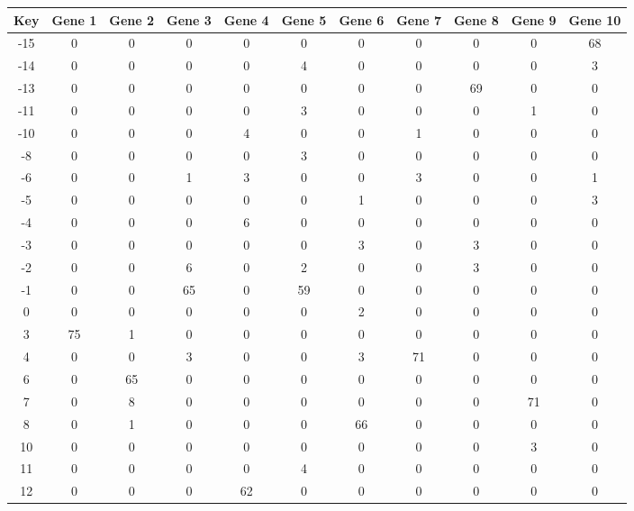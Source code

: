 \begin{tabular}{|c|c|c|c|c|c|c|c|c|c|c|}
\hline
Key & Gene 1 & Gene 2 & Gene 3 & Gene 4 & Gene 5 & Gene 6 & Gene 7 & Gene 8 & Gene 9 & Gene 10 \\
\hline
-15 & 0 & 0 & 0 & 0 & 0 & 0 & 0 & 0 & 0 & 68 \\
-14 & 0 & 0 & 0 & 0 & 4 & 0 & 0 & 0 & 0 & 3 \\
-13 & 0 & 0 & 0 & 0 & 0 & 0 & 0 & 69 & 0 & 0 \\
-11 & 0 & 0 & 0 & 0 & 3 & 0 & 0 & 0 & 1 & 0 \\
-10 & 0 & 0 & 0 & 4 & 0 & 0 & 1 & 0 & 0 & 0 \\
-8 & 0 & 0 & 0 & 0 & 3 & 0 & 0 & 0 & 0 & 0 \\
-6 & 0 & 0 & 1 & 3 & 0 & 0 & 3 & 0 & 0 & 1 \\
-5 & 0 & 0 & 0 & 0 & 0 & 1 & 0 & 0 & 0 & 3 \\
-4 & 0 & 0 & 0 & 6 & 0 & 0 & 0 & 0 & 0 & 0 \\
-3 & 0 & 0 & 0 & 0 & 0 & 3 & 0 & 3 & 0 & 0 \\
-2 & 0 & 0 & 6 & 0 & 2 & 0 & 0 & 3 & 0 & 0 \\
-1 & 0 & 0 & 65 & 0 & 59 & 0 & 0 & 0 & 0 & 0 \\
0 & 0 & 0 & 0 & 0 & 0 & 2 & 0 & 0 & 0 & 0 \\
3 & 75 & 1 & 0 & 0 & 0 & 0 & 0 & 0 & 0 & 0 \\
4 & 0 & 0 & 3 & 0 & 0 & 3 & 71 & 0 & 0 & 0 \\
6 & 0 & 65 & 0 & 0 & 0 & 0 & 0 & 0 & 0 & 0 \\
7 & 0 & 8 & 0 & 0 & 0 & 0 & 0 & 0 & 71 & 0 \\
8 & 0 & 1 & 0 & 0 & 0 & 66 & 0 & 0 & 0 & 0 \\
10 & 0 & 0 & 0 & 0 & 0 & 0 & 0 & 0 & 3 & 0 \\
11 & 0 & 0 & 0 & 0 & 4 & 0 & 0 & 0 & 0 & 0 \\
12 & 0 & 0 & 0 & 62 & 0 & 0 & 0 & 0 & 0 & 0 \\
\hline
\end{tabular}